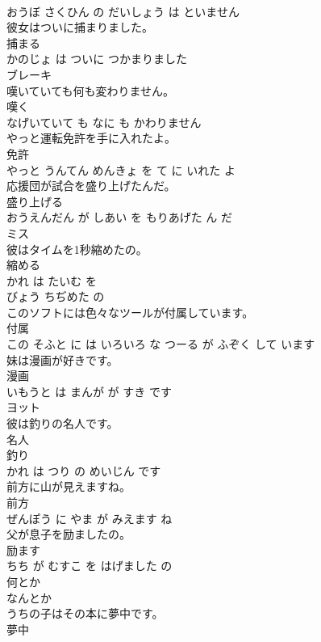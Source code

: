 \documentclass[8pt]{extreport}
\begin{document}
\begin{CJK}{UTF8}{min}
\\	おうぼ さくひん の だいしょう は といません			
\\	彼女はついに捕まりました。	
\\	捕まる 
\\	かのじょ は ついに つかまりました			
\\	ブレーキ	
\\	嘆いていても何も変わりません。	
\\	嘆く 
\\	なげいていて も なに も かわりません			
\\	やっと運転免許を手に入れたよ。	
\\	免許 
\\	やっと うんてん めんきょ を て に いれた よ			
\\	応援団が試合を盛り上げたんだ。	
\\	盛り上げる 
\\	おうえんだん が しあい を もりあげた ん だ			
\\	ミス	
\\	彼はタイムを1秒縮めたの。	
\\	縮める 
\\	かれ は たいむ を 
\\	びょう ちぢめた の			
\\	このソフトには色々なツールが付属しています。	
\\	付属 
\\	この そふと に は いろいろ な つーる が ふぞく して います			
\\	妹は漫画が好きです。	
\\	漫画 
\\	いもうと は まんが が すき です			
\\	ヨット	
\\	彼は釣りの名人です。	
\\	名人 
\\	釣り 
\\	かれ は つり の めいじん です			
\\	前方に山が見えますね。	
\\	前方 
\\	ぜんぽう に やま が みえます ね			
\\	父が息子を励ましたの。	
\\	励ます 
\\	ちち が むすこ を はげました の			
\\	何とか	
\\	なんとか			
\\	うちの子はその本に夢中です。	
\\	夢中 

\end{CJK}
\end{document}
